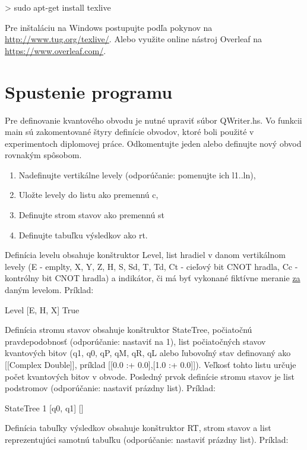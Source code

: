 \begin{code}
> sudo apt-get install texlive
\end{code}

Pre inštaláciu na Windows postupujte podľa pokynov na \url{http://www.tug.org/texlive/}. Alebo využite online nástroj Overleaf na \url{https://www.overleaf.com/}.

\section{Spustenie programu}

Pre definovanie kvantového obvodu je nutné upraviť súbor QWriter.hs. Vo 
funkcii main sú zakomentované štyry definície obvodov, ktoré boli použité 
v experimentoch diplomovej práce. Odkomentujte jeden alebo definujte nový
obvod rovnakým spôsobom. 

\begin{enumerate}
    \item Nadefinujte vertikálne levely (odporúčanie: pomenujte ich l1..ln),
    \item Uložte levely do listu ako premennú c,
    \item Definujte strom stavov ako premennú st
    \item Definujte tabuľku výsledkov ako rt.
\end{enumerate}

Definícia levelu obsahuje konštruktor Level, list hradiel v danom vertikálnom
levely (E - emplty, X, Y, Z, H, S, Sd, T, Td, Ct - cieľový bit CNOT hradla, 
Cc - kontrólny bit CNOT hradla) a indikátor, či má byť vykonané fiktívne
meranie \underline{za} daným levelom. Príklad:

\begin{code}
Level [E, H, X] True
\end{code}

Definícia stromu stavov obsahuje konštruktor StateTree, počiatočnú 
pravdepodobnosť (odporúčanie: nastaviť na 1), list počiatočných stavov
kvantových bitov (q1, q0, qP, qM, qR, qL alebo ľubovoľný stav definovaný
ako [[Complex Double]], príklad [[0.0 :+ 0.0],[1.0 :+ 0.0]]). 
Veľkosť tohto listu určuje počet kvantových bitov v obvode. Posledný prvok
definície stromu stavov je list podstromov (odporúčanie: nastaviť prázdny list).
Príklad:

\begin{code}
StateTree 1 [q0, q1] []
\end{code}

Definícia tabuľky výsledkov obsahuje konštruktor RT, strom stavov a list 
reprezentujúci samotnú tabuľku (odporúčanie: nastaviť prázdny list). Príklad:

